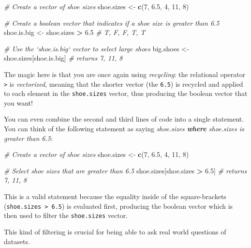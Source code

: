 \documentclass[]{book}
\newenvironment{Shaded}{\begin{snugshade}}{\end{snugshade}}
\newcommand{\KeywordTok}[1]{\textcolor[rgb]{0.13,0.29,0.53}{\textbf{#1}}}
\newcommand{\DecValTok}[1]{\textcolor[rgb]{0.00,0.00,0.81}{#1}}
\newcommand{\FloatTok}[1]{\textcolor[rgb]{0.00,0.00,0.81}{#1}}
\newcommand{\StringTok}[1]{\textcolor[rgb]{0.31,0.60,0.02}{#1}}
\newcommand{\CommentTok}[1]{\textcolor[rgb]{0.56,0.35,0.01}{\textit{#1}}}
\newcommand{\OperatorTok}[1]{\textcolor[rgb]{0.81,0.36,0.00}{\textbf{#1}}}
\newcommand{\NormalTok}[1]{#1}
\theoremstyle{definition}
\theoremstyle{definition}
\theoremstyle{remark}
\begin{document}
\begin{Shaded}
\begin{Highlighting}[]
\CommentTok{# Create a vector of shoe sizes}
\NormalTok{shoe.sizes <-}\StringTok{ }\KeywordTok{c}\NormalTok{(}\DecValTok{7}\NormalTok{, }\FloatTok{6.5}\NormalTok{, }\DecValTok{4}\NormalTok{, }\DecValTok{11}\NormalTok{, }\DecValTok{8}\NormalTok{)}

\CommentTok{# Create a boolean vector that indicates if a shoe size is greater than 6.5}
\NormalTok{shoe.is.big <-}\StringTok{ }\NormalTok{shoe.sizes }\OperatorTok{>}\StringTok{ }\FloatTok{6.5}  \CommentTok{# T, F, F, T, T}

\CommentTok{# Use the `shoe.is.big` vector to select large shoes}
\NormalTok{big.shoes <-}\StringTok{ }\NormalTok{shoe.sizes[shoe.is.big]  }\CommentTok{# returns 7, 11, 8}
\end{Highlighting}
\end{Shaded}

The magic here is that you are once again using \emph{recycling}: the
relational operator \texttt{\textgreater{}} is \emph{vectorized},
meaning that the shorter vector (the \texttt{6.5}) is recycled and
applied to each element in the \texttt{shoe.sizes} vector, thus
producing the boolean vector that you want!

You can even combine the second and third lines of code into a single
statement. You can think of the following statement as saying
\emph{shoe.sizes \textbf{where} shoe.sizes is greater than 6.5}:

\begin{Shaded}
\begin{Highlighting}[]
\CommentTok{# Create a vector of shoe sizes}
\NormalTok{shoe.sizes <-}\StringTok{ }\KeywordTok{c}\NormalTok{(}\DecValTok{7}\NormalTok{, }\FloatTok{6.5}\NormalTok{, }\DecValTok{4}\NormalTok{, }\DecValTok{11}\NormalTok{, }\DecValTok{8}\NormalTok{)}

\CommentTok{# Select shoe sizes that are greater than 6.5}
\NormalTok{shoe.sizes[shoe.sizes }\OperatorTok{>}\StringTok{ }\FloatTok{6.5}\NormalTok{]  }\CommentTok{# returns 7, 11, 8}
\end{Highlighting}
\end{Shaded}

This is a valid statement because the equality inside of the
square-brackets (\texttt{shoe.sizes\ \textgreater{}\ 6.5}) is evaluated
first, producing the boolean vector which is then used to filter the
\texttt{shoe.sizes} vector.

This kind of filtering is crucial for being able to ask real world
questions of datasets.
\end{document}
